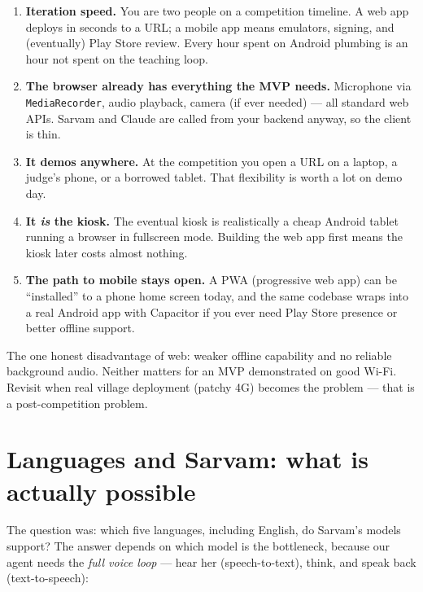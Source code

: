 \documentclass[11pt]{article}
\begin{document}
\begin{enumerate}
  \item \textbf{Iteration speed.} You are two people on a competition timeline. A web app deploys in seconds to a URL; a mobile app means emulators, signing, and (eventually) Play Store review. Every hour spent on Android plumbing is an hour not spent on the teaching loop.
  \item \textbf{The browser already has everything the MVP needs.} Microphone via \texttt{MediaRecorder}, audio playback, camera (if ever needed) --- all standard web APIs. Sarvam and Claude are called from your backend anyway, so the client is thin.
  \item \textbf{It demos anywhere.} At the competition you open a URL on a laptop, a judge's phone, or a borrowed tablet. That flexibility is worth a lot on demo day.
  \item \textbf{It \emph{is} the kiosk.} The eventual kiosk is realistically a cheap Android tablet running a browser in fullscreen mode. Building the web app first means the kiosk later costs almost nothing.
  \item \textbf{The path to mobile stays open.} A PWA (progressive web app) can be ``installed'' to a phone home screen today, and the same codebase wraps into a real Android app with Capacitor if you ever need Play Store presence or better offline support.
\end{enumerate}

The one honest disadvantage of web: weaker offline capability and no reliable background audio. Neither matters for an MVP demonstrated on good Wi-Fi. Revisit when real village deployment (patchy 4G) becomes the problem --- that is a post-competition problem.

\section{Languages and Sarvam: what is actually possible}
\label{sec:languages}

The question was: which five languages, including English, do Sarvam's models support? The answer depends on which model is the bottleneck, because our agent needs the \emph{full voice loop} --- hear her (speech-to-text), think, and speak back (text-to-speech):
\end{document}
